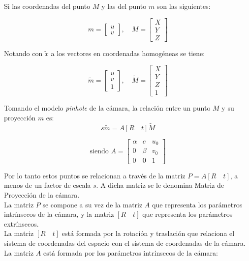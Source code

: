 Si las coordenadas del punto  $M$ y las del punto $m$ son las siguientes:


\[m = \begin{bmatrix}
u \\ 
v
\end{bmatrix} , \quad
M = \begin{bmatrix}
X \\ 
Y \\
Z
\end{bmatrix} \]

Notando con $\tilde{x}$ a los vectores en coordenadas homogéneas se tiene:


\[\tilde{m} = \begin{bmatrix}
u \\ 
v \\
1
\end{bmatrix} , \quad
\tilde{M} = \begin{bmatrix}
X \\ 
Y \\
Z \\
1
\end{bmatrix} \]

Tomando el modelo \textit{pinhole} de la cámara, la relación entre un punto $M$ y su proyección $m$ es:
\begin{equation}
s\tilde{m} = A [R \quad t]\tilde{M}
\label{proyeccion}
\end{equation}




\begin{equation}
\text{siendo }
A = \begin{bmatrix}
\alpha & c & u_0 \\ 
0 & \beta & v_0 \\ 
0 & 0 & 1
\end{bmatrix} 
\end{equation}

Por lo tanto estos puntos se relacionan a través de la matriz $P = A [R \quad t]$, a menos de un factor de escala $s$. A dicha matriz  se le denomina Matriz de Proyección de la cámara.\\

La matriz $P$ se compone a su vez de la matriz $A$ que representa los parámetros intrínsecos de la cámara, y la matriz $[R \quad t]$ que representa los parámetros extrínsecos.\\

La matriz $[R \quad t]$ está formada por la rotación y traslación que relaciona el sistema de coordenadas del espacio con el sistema de coordenadas de la cámara. La matriz $A$ está formada por los parámetros intrínsecos de la cámara:\\



